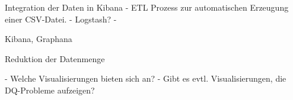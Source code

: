 


Integration der Daten in Kibana
- ETL Prozess zur automatischen Erzeugung einer CSV-Datei.
- Logstash?
- 

Kibana, Graphana

Reduktion der Datenmenge



- Welche Visualisierungen bieten sich an?
- Gibt es evtl. Visualisierungen, die DQ-Probleme aufzeigen?


